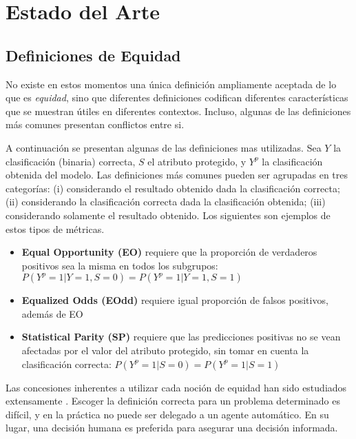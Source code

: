 \chapter{Estado del Arte}\label{chapter:state-of-the-art}


\section{Definiciones de Equidad}

No existe en estos momentos una única definición ampliamente aceptada de lo que es \textit{equidad}, sino que diferentes definiciones codifican diferentes características que se muestran útiles en diferentes contextos.
Incluso, algunas de las definiciones más comunes presentan conflictos entre si.

A continuación se presentan algunas de las definiciones mas utilizadas. Sea $Y$ la clasificación (binaria) correcta, $S$ el atributo protegido, y $Y^p$ la clasificación obtenida del modelo.
Las definiciones más comunes pueden ser agrupadas en tres categorías:
(i) considerando el resultado obtenido dada la clasificación correcta;
(ii) considerando la clasificación correcta dada la clasificación obtenida;
(iii) considerando solamente el resultado obtenido.
Los siguientes son ejemplos de estos tipos de métricas.

\begin{itemize}
    \item \textbf{Equal Opportunity (EO)} requiere que la proporción de verdaderos positivos sea la misma en todos los subgrupos: $P(Y^p=1 | Y=1, S=0) = P(Y^p=1 | Y=1, S=1)$
    \item \textbf{Equalized Odds (EOdd)} requiere igual proporción de falsos positivos, además de EO
    \item \textbf{Statistical Parity (SP)} requiere que las predicciones positivas no se vean afectadas por el valor del atributo protegido, sin tomar en cuenta la clasificación correcta: $P(Y^p=1 | S=0) = P(Y^p=1 | S=1)$
\end{itemize}

Las concesiones inherentes a utilizar cada noción de equidad han sido estudiados extensamente \parencite{dwork2012fairness, friedler2016possibility, kleinberg2018inherent}.
Escoger la definición correcta para un problema determinado es difícil, y en la práctica no puede ser delegado a un agente automático.
En su lugar, una decisión humana es preferida para asegurar una decisión informada.

